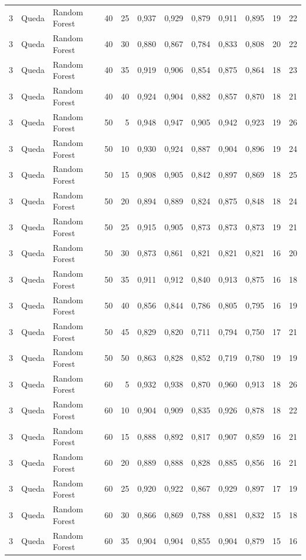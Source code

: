 \begin{longtable}{@{}rllrrrrrrrrr@{}}
3 & Queda & Random Forest & 40 & 25 & 0,937 & 0,929 & 0,879 & 0,911 & 0,895 & 19 & 22 \\
3 & Queda & Random Forest & 40 & 30 & 0,880 & 0,867 & 0,784 & 0,833 & 0,808 & 20 & 22 \\
3 & Queda & Random Forest & 40 & 35 & 0,919 & 0,906 & 0,854 & 0,875 & 0,864 & 18 & 23 \\
3 & Queda & Random Forest & 40 & 40 & 0,924 & 0,904 & 0,882 & 0,857 & 0,870 & 18 & 21 \\
3 & Queda & Random Forest & 50 & 5 & 0,948 & 0,947 & 0,905 & 0,942 & 0,923 & 19 & 26 \\
3 & Queda & Random Forest & 50 & 10 & 0,930 & 0,924 & 0,887 & 0,904 & 0,896 & 19 & 24 \\
3 & Queda & Random Forest & 50 & 15 & 0,908 & 0,905 & 0,842 & 0,897 & 0,869 & 18 & 25 \\
3 & Queda & Random Forest & 50 & 20 & 0,894 & 0,889 & 0,824 & 0,875 & 0,848 & 18 & 24 \\
3 & Queda & Random Forest & 50 & 25 & 0,915 & 0,905 & 0,873 & 0,873 & 0,873 & 19 & 21 \\
3 & Queda & Random Forest & 50 & 30 & 0,873 & 0,861 & 0,821 & 0,821 & 0,821 & 16 & 20 \\
3 & Queda & Random Forest & 50 & 35 & 0,911 & 0,912 & 0,840 & 0,913 & 0,875 & 16 & 18 \\
3 & Queda & Random Forest & 50 & 40 & 0,856 & 0,844 & 0,786 & 0,805 & 0,795 & 16 & 19 \\
3 & Queda & Random Forest & 50 & 45 & 0,829 & 0,820 & 0,711 & 0,794 & 0,750 & 17 & 21 \\
3 & Queda & Random Forest & 50 & 50 & 0,863 & 0,828 & 0,852 & 0,719 & 0,780 & 19 & 19 \\
3 & Queda & Random Forest & 60 & 5 & 0,932 & 0,938 & 0,870 & 0,960 & 0,913 & 18 & 26 \\
3 & Queda & Random Forest & 60 & 10 & 0,904 & 0,909 & 0,835 & 0,926 & 0,878 & 18 & 22 \\
3 & Queda & Random Forest & 60 & 15 & 0,888 & 0,892 & 0,817 & 0,907 & 0,859 & 16 & 21 \\
3 & Queda & Random Forest & 60 & 20 & 0,889 & 0,888 & 0,828 & 0,885 & 0,856 & 16 & 21 \\
3 & Queda & Random Forest & 60 & 25 & 0,920 & 0,922 & 0,867 & 0,929 & 0,897 & 17 & 19 \\
3 & Queda & Random Forest & 60 & 30 & 0,866 & 0,869 & 0,788 & 0,881 & 0,832 & 15 & 18 \\
3 & Queda & Random Forest & 60 & 35 & 0,904 & 0,904 & 0,855 & 0,904 & 0,879 & 15 & 16 \\

\end{longtable}

